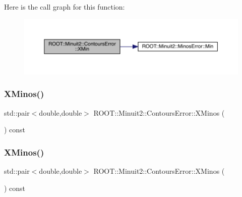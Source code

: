 Here is the call graph for this function\+:
\nopagebreak
\begin{figure}[H]
\begin{center}
\leavevmode
\includegraphics[width=350pt]{d3/de9/classROOT_1_1Minuit2_1_1ContoursError_ac0dbac1ec08765a632908c88c5f24822_cgraph}
\end{center}
\end{figure}
\mbox{\label{classROOT_1_1Minuit2_1_1ContoursError_afd1906c6e1b9ddd74363df072590183f}} 
\subsubsection{\texorpdfstring{XMinos()}{XMinos()}\hspace{0.1cm}{\footnotesize\ttfamily [1/2]}}
{\footnotesize\ttfamily std\+::pair$<$double,double$>$ R\+O\+O\+T\+::\+Minuit2\+::\+Contours\+Error\+::\+X\+Minos (\begin{DoxyParamCaption}{ }\end{DoxyParamCaption}) const\hspace{0.3cm}{\ttfamily [inline]}}

\mbox{\label{classROOT_1_1Minuit2_1_1ContoursError_afd1906c6e1b9ddd74363df072590183f}} 
\subsubsection{\texorpdfstring{XMinos()}{XMinos()}\hspace{0.1cm}{\footnotesize\ttfamily [2/2]}}
{\footnotesize\ttfamily std\+::pair$<$double,double$>$ R\+O\+O\+T\+::\+Minuit2\+::\+Contours\+Error\+::\+X\+Minos (\begin{DoxyParamCaption}{ }\end{DoxyParamCaption}) const\hspace{0.3cm}{\ttfamily [inline]}}

